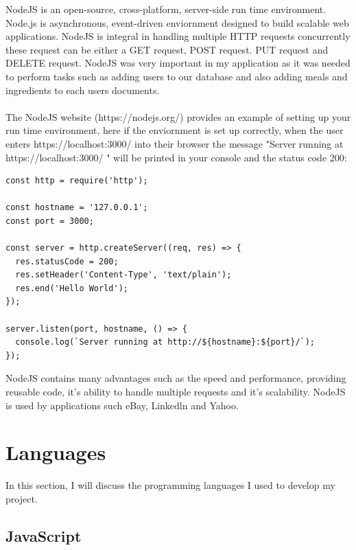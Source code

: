 NodeJS is an open-source, cross-platform, server-side run time environment. Node.js is asynchronous, event-driven enviornment designed to build scalable web applications. NodeJS is integral in handling multiple HTTP requests concurrently these request can be either a GET request, POST request. PUT request and DELETE request. NodeJS was very important in my application as it was needed to perform tasks such as adding users to our database and also adding meals and ingredients to each users documents.\\ \\
The NodeJS website (https://nodejs.org/) provides an example of setting up your run time environment, here if the enviornment is set up correctly, when the user enters https://localhost:3000/ into their browser the message "Server running at https://localhost:3000/ " will be printed in your console and the status code 200:
\begin{verbatim}
const http = require('http');

const hostname = '127.0.0.1';
const port = 3000;

const server = http.createServer((req, res) => {
  res.statusCode = 200;
  res.setHeader('Content-Type', 'text/plain');
  res.end('Hello World');
});

server.listen(port, hostname, () => {
  console.log(`Server running at http://${hostname}:${port}/`);
});
\end{verbatim}
NodeJS contains many advantages such as the speed and performance, providing reusable code, it's ability to handle multiple requests and it's scalability.
NodeJS is used by applications such eBay, Linkedln and Yahoo.

\section{Languages}

In this section, I will discuss the programming languages I used to develop my project.

\subsection{JavaScript}

